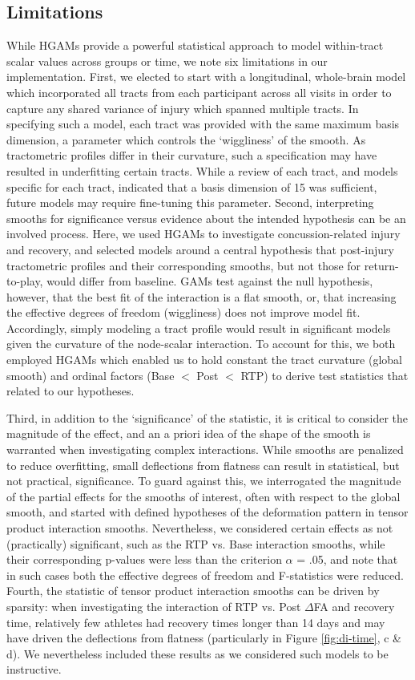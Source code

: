 \documentclass[12pt]{article}
\begin{document}
\subsection{Limitations}
\label{ssec:disc-limit}
While HGAMs provide a powerful statistical approach to model within-tract scalar values across groups or time, we note six limitations in our implementation. First, we elected to start with a longitudinal, whole-brain model which incorporated all tracts from each participant across all visits in order to capture any shared variance of injury which spanned multiple tracts. In specifying such a model, each tract was provided with the same maximum basis dimension, a parameter which controls the `wiggliness' of the smooth. As tractometric profiles differ in their curvature, such a specification may have resulted in underfitting certain tracts. While a review of each tract, and models specific for each tract, indicated that a basis dimension of 15 was sufficient, future models may require fine-tuning this parameter. Second, interpreting smooths for significance versus evidence about the intended hypothesis can be an involved process. Here, we used HGAMs to investigate concussion-related injury and recovery, and selected models around a central hypothesis that post-injury tractometric profiles and their corresponding smooths, but not those for return-to-play, would differ from baseline. GAMs test against the null hypothesis, however, that the best fit of the interaction is a flat smooth, or, that increasing the effective degrees of freedom (wiggliness) does not improve model fit. Accordingly, simply modeling a tract profile would result in significant models given the curvature of the node-scalar interaction. To account for this, we both employed HGAMs which enabled us to hold constant the tract curvature (global smooth) and ordinal factors (Base $<$ Post $<$ RTP) to derive test statistics that related to our hypotheses.

Third, in addition to the `significance' of the statistic, it is critical to consider the magnitude of the effect, and an a priori idea of the shape of the smooth is warranted when investigating complex interactions. While smooths are penalized to reduce overfitting, small deflections from flatness can result in statistical, but not practical, significance. To guard against this, we interrogated the magnitude of the partial effects for the smooths of interest, often with respect to the global smooth, and started with defined hypotheses of the deformation pattern in tensor product interaction smooths. Nevertheless, we considered certain effects as not (practically) significant, such as the RTP vs. Base interaction smooths, while their corresponding p-values were less than the criterion $\alpha$ = .05, and note that in such cases both the effective degrees of freedom and F-statistics were reduced. Fourth, the statistic of tensor product interaction smooths can be driven by sparsity: when investigating the interaction of RTP vs. Post $\Delta$FA and recovery time, relatively few athletes had recovery times longer than 14 days and may have driven the deflections from flatness (particularly in Figure \ref{fig:di-time}, c \& d). We nevertheless included these results as we considered such models to be instructive.
\end{document}
